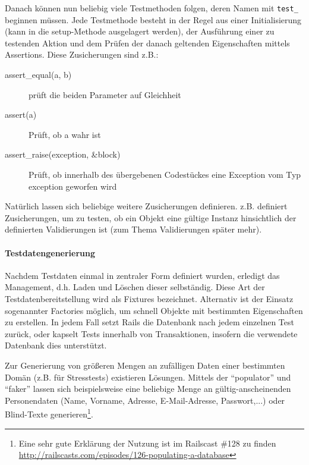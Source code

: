 Danach können nun beliebig viele Testmethoden folgen, deren Namen mit \texttt{test\_} beginnen müssen.
Jede Testmethode besteht in der Regel aus einer Initialisierung (kann in die setup-Methode ausgelagert werden), der Ausführung einer zu testenden Aktion und dem Prüfen der danach geltenden Eigenschaften mittels Assertions. Diese Zusicherungen sind z.B.:
\begin{description}
 \item[assert\_equal(a, b)] prüft die beiden Parameter auf Gleichheit
 \item[assert(a)] Prüft, ob a wahr ist
 \item[assert\_raise(exception, \&block)] Prüft, ob innerhalb des übergebenen Codestückes eine Exception vom Typ exception geworfen wird
\end{description}
Natürlich lassen sich beliebige weitere Zusicherungen definieren.  z.B. definiert Zusicherungen, um zu testen, ob ein Objekt eine gültige Instanz hinsichtlich der definierten Validierungen ist (zum Thema Validierungen später mehr).

\paragraph{Testdatengenerierung}
Nachdem Testdaten einmal in zentraler Form definiert wurden, erledigt  das Management, d.h. Laden und Löschen dieser selbständig. Diese Art der Testdatenbereitstellung wird als Fixtures bezeichnet. Alternativ ist der Einsatz sogenannter Factories möglich, um schnell Objekte mit bestimmten Eigenschaften zu erstellen. In jedem Fall setzt Rails die Datenbank nach jedem einzelnen Test zurück, oder kapselt Tests innerhalb von Transaktionen, insofern die verwendete Datenbank dies unterstützt.

Zur Generierung von größeren Mengen an zufälligen Daten einer bestimmten Domän (z.B. für Stresstests) existieren Lösungen. Mittels der  "`populator"' und "`faker"' lassen sich beispielsweise eine beliebige Menge an gültig-anscheinenden Personendaten (Name, Vorname, Adresse, E-Mail-Adresse, Passwort,...) oder Blind-Texte generieren\footnote{Eine sehr gute Erklärung der Nutzung ist im Railscast \#128 zu finden \url{http://railscasts.com/episodes/126-populating-a-database}}.


